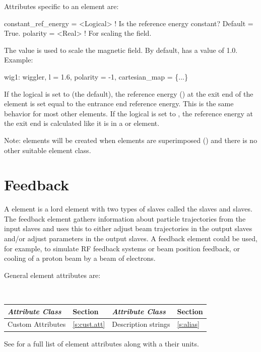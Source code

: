 Attributes specific to an  element are:
\begin{example}
  constant_ref_energy = <Logical> ! Is the reference energy constant? Default = True.
  polarity   = <Real>  ! For scaling the field.
\end{example}

The  value is used to scale the magnetic field. By
default,  has a value of 1.0.  Example:
\begin{example}
  wig1: wiggler, l = 1.6, polarity = -1, cartesian_map = \{...\}
\end{example}

If the  logical is set to  (the default), the reference energy
() at the exit end of the element is set equal to the entrance end reference
energy. This is the same behavior for most other elements. If the  logical
is set to , the reference energy at the exit end is calculated like it is in a
 or  element.

Note:  elements will be created when elements are superimposed () and
there is no other suitable element class.

\newpage

\section{Feedback}
\label{s:feedback}

A  element is a lord element with two types of slaves called the  slaves and
 slaves.  The feedback element gathers information about particle trajectories from the
input slaves and uses this to either adjust beam trajectories in the output slaves and/or adjust
parameters in the output slaves. A feedback element could be used, for example, to simulate RF feedback
systems or beam position feedback, or cooling of a proton beam by a beam of electrons.

General  element attributes are:
\begin{center}
\tt
\begin{tabular}{llll} \toprule
  {\sl Attribute Class}      & Section           & {\sl Attribute Class}      & Section         \\ \midrule
  Custom Attributes          & \ref{s:cust.att}  & Description strings        & \ref{s:alias}     \\
  \bottomrule
\end{tabular}
\end{center}
\toffset
See  for a full list of element attributes along with a their units.

